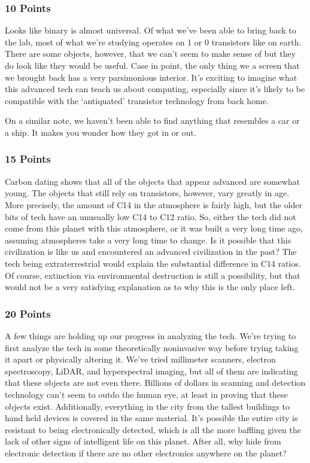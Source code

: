 \documentclass[conference]{IEEEtran}
\begin{document}
\subsubsection*{10 Points}
Looks like binary is almost universal. Of what we’ve been able to bring back to the lab, most of what we’re studying operates on 1 or 0 transistors like on earth. There are some objects, however, that we can’t seem to make sense of but they do look like they would be useful. Case in point, the only thing we a screen that we brought back has a very parsimonious interior. It’s exciting to imagine what this advanced tech can teach us about computing, especially since it’s likely to be compatible with the ‘antiquated’ transistor technology from back home.

On a similar note, we haven’t been able to find anything that resembles a car or a ship. It makes you wonder how they got in or out.

\subsubsection*{15 Points}
Carbon dating shows that all of the objects that appear advanced are somewhat young. The objects that still rely on transistors, however, vary greatly in age. More precisely, the amount of C14 in the atmosphere is fairly high, but the older bits of tech have an unusually low C14 to C12 ratio. So, either the tech did not come from this planet with this atmosphere, or it was built a very long time ago, assuming atmospheres take a very long time to change. Is it possible that this civilization is like us and encountered an advanced civilization in the past? The tech being extraterrestrial would explain the substantial difference in C14 ratios. Of course, extinction via environmental destruction is still a possibility, but that would not be a very satisfying explanation as to why this is the only place left.

\subsubsection*{20 Points}
A few things are holding up our progress in analyzing the tech. We’re trying to first analyze the tech in some theoretically noninvasive way before trying taking it apart or physically altering it. We’ve tried millimeter scanners, electron spectroscopy, LiDAR, and hyperspectral imaging, but all of them are indicating that these objects are not even there. Billions of dollars in scanning and detection technology can’t seem to outdo the human eye, at least in proving that these objects exist. Additionally, everything in the city from the tallest buildings to hand held devices is covered in the same material. It’s possible the entire city is resistant to being electronically detected, which is all the more baffling given the lack of other signs of intelligent life on this planet. After all, why hide from electronic detection if there are no other electronics anywhere on the planet?
\end{document}
